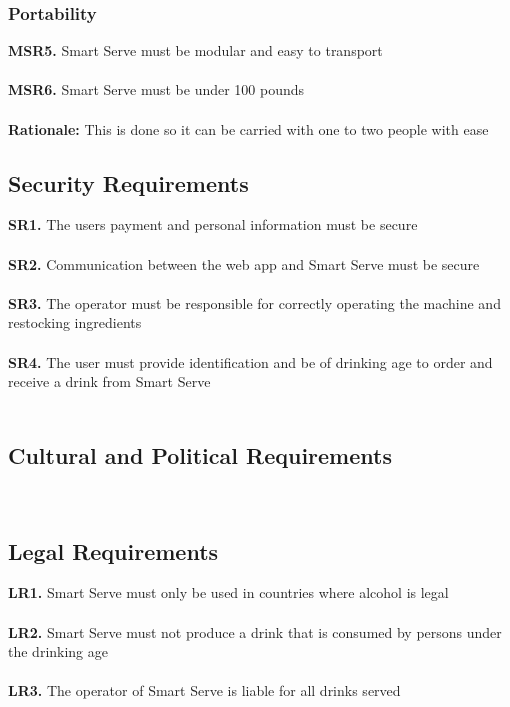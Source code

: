 \documentclass{article}
\begin{document}
    \subsubsection{Portability}
        \noindent\textbf{MSR5.} Smart Serve must be modular and easy to transport \\\\
        \textbf{MSR6.} Smart Serve must be under 100 pounds \\\\
        \indent\textbf{Rationale:} This is done so it can be carried with one to two people with ease\\

\subsection{Security Requirements}
    \noindent\textbf{SR1.} The users payment and personal information must be secure \\\\
    \textbf{SR2.} Communication between the web app and Smart Serve must be secure \\\\
    \textbf{SR3.} The operator must be responsible for correctly operating the machine and restocking ingredients \\\\
    \textbf{SR4.} The user must provide identification and be of drinking age to order and receive a drink from Smart Serve \\\\

\subsection{Cultural and Political Requirements}
     \\
\subsection{Legal Requirements}
    \noindent\textbf{LR1.} Smart Serve must only be used in countries where alcohol is legal \\\\
    \textbf{LR2.} Smart Serve must not produce a drink that is consumed by persons under the drinking age \\\\
    \textbf{LR3.} The operator of Smart Serve is liable for all drinks served \\
\end{document}
